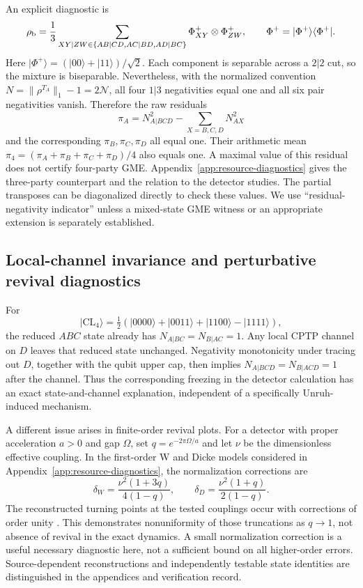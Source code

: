 \documentclass[pdflatex,sn-mathphys-num]{sn-jnl}
\begin{document}
An explicit diagnostic is
\begin{equation}
\rho_{\rm b}=\frac13\sum_{XY|ZW\in\{AB|CD,AC|BD,AD|BC\}}
\Phi^+_{XY}\otimes\Phi^+_{ZW},\qquad
\Phi^+=|\Phi^+\rangle\langle\Phi^+|.
\label{eq:main-gme-counterexample}
\end{equation}
Here $|\Phi^+\rangle=(|00\rangle+|11\rangle)/\sqrt2$. Each component is separable across a $2|2$ cut, so the mixture is biseparable. Nevertheless, with the normalized convention $N=\|\rho^{T_A}\|_1-1=2\mathcal N$, all four $1|3$ negativities equal one and all six pair negativities vanish. Therefore the raw residuals
\begin{equation}
\pi_A=N_{A|BCD}^2-\sum_{X=B,C,D}N_{AX}^2
\end{equation}
and the corresponding $\pi_B,\pi_C,\pi_D$ all equal one. Their arithmetic mean $\pi_4=(\pi_A+\pi_B+\pi_C+\pi_D)/4$ also equals one. A maximal value of this residual does not certify four-party GME. Appendix~\ref{app:resource-diagnostics} gives the three-party counterpart and the relation to the detector studies. The partial transposes can be diagonalized directly to check these values. We use ``residual-negativity indicator'' unless a mixed-state GME witness or an appropriate extension is separately established.

\subsection{Local-channel invariance and perturbative revival diagnostics}
For
\begin{equation}
|\mathrm{CL}_4\rangle=\tfrac12(|0000\rangle+|0011\rangle+|1100\rangle-|1111\rangle),
\end{equation}
the reduced $ABC$ state already has $N_{A|BC}=N_{B|AC}=1$. Any local CPTP channel on $D$ leaves that reduced state unchanged. Negativity monotonicity under tracing out $D$, together with the qubit upper cap, then implies $N_{A|BCD}=N_{B|ACD}=1$ after the channel. Thus the corresponding freezing in the detector calculation \cite{LiCluster2026} has an exact state-and-channel explanation, independent of a specifically Unruh-induced mechanism.

A different issue arises in finite-order revival plots. For a detector with proper acceleration $a>0$ and gap $\Omega$, set $q=e^{-2\pi\Omega/a}$ and let $\nu$ be the dimensionless effective coupling. In the first-order W and Dicke models considered in Appendix~\ref{app:resource-diagnostics}, the normalization corrections are
\begin{equation}
\delta_W=\frac{\nu^2(1+3q)}{4(1-q)},\qquad
\delta_D=\frac{\nu^2(1+q)}{2(1-q)}.
\end{equation}
The reconstructed turning points at the tested couplings occur with corrections of order unity \cite{LiWState2025,WuDicke2026}. This demonstrates nonuniformity of those truncations as $q\to1$, not absence of revival in the exact dynamics. A small normalization correction is a useful necessary diagnostic here, not a sufficient bound on all higher-order errors. Source-dependent reconstructions and independently testable state identities are distinguished in the appendices and verification record.
\end{document}
